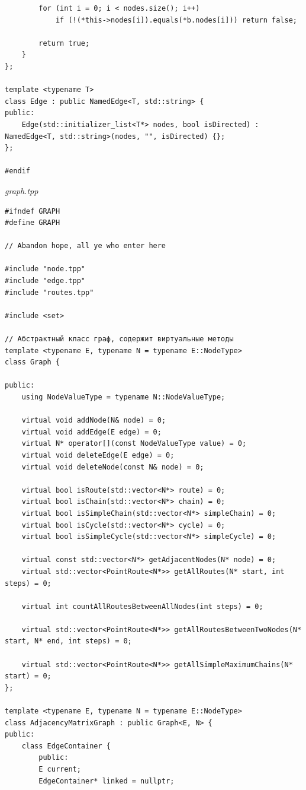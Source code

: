 \documentclass[a4paper,14pt]{extarticle}
\begin{document}
\begin{enumerate}[1.]
\begin{verbatim}
        for (int i = 0; i < nodes.size(); i++)
            if (!(*this->nodes[i]).equals(*b.nodes[i])) return false;
        
        return true;
    }
};

template <typename T>
class Edge : public NamedEdge<T, std::string> {
public:
    Edge(std::initializer_list<T*> nodes, bool isDirected) : NamedEdge<T, std::string>(nodes, "", isDirected) {};
};

#endif
        \end{verbatim} 

        \textit{graph.tpp}
        \begin{verbatim}
#ifndef GRAPH
#define GRAPH

// Abandon hope, all ye who enter here

#include "node.tpp"
#include "edge.tpp"
#include "routes.tpp"

#include <set>

// Абстрактный класс граф, содержит виртуальные методы
template <typename E, typename N = typename E::NodeType>
class Graph {

public:
    using NodeValueType = typename N::NodeValueType;

    virtual void addNode(N& node) = 0;
    virtual void addEdge(E edge) = 0;
    virtual N* operator[](const NodeValueType value) = 0;
    virtual void deleteEdge(E edge) = 0;
    virtual void deleteNode(const N& node) = 0;

    virtual bool isRoute(std::vector<N*> route) = 0;
    virtual bool isChain(std::vector<N*> chain) = 0;
    virtual bool isSimpleChain(std::vector<N*> simpleChain) = 0;
    virtual bool isCycle(std::vector<N*> cycle) = 0;
    virtual bool isSimpleCycle(std::vector<N*> simpleCycle) = 0;

    virtual const std::vector<N*> getAdjacentNodes(N* node) = 0;
    virtual std::vector<PointRoute<N*>> getAllRoutes(N* start, int steps) = 0;

    virtual int countAllRoutesBetweenAllNodes(int steps) = 0;

    virtual std::vector<PointRoute<N*>> getAllRoutesBetweenTwoNodes(N* start, N* end, int steps) = 0;

    virtual std::vector<PointRoute<N*>> getAllSimpleMaximumChains(N* start) = 0;
};

template <typename E, typename N = typename E::NodeType>
class AdjacencyMatrixGraph : public Graph<E, N> {
public:
    class EdgeContainer {
        public:
        E current;
        EdgeContainer* linked = nullptr;


\end{verbatim}
\end{enumerate}
\end{document}
